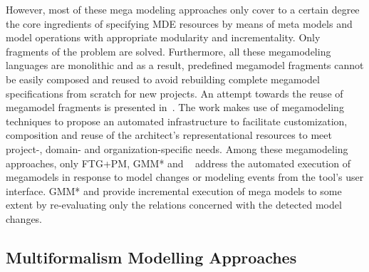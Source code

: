 However, most of these mega modeling approaches only cover to a certain degree
the core ingredients of specifying MDE resources by means of meta models and
model operations with appropriate modularity and incrementality. Only fragments
of the problem are solved. Furthermore, all these megamodeling languages are
monolithic and as a result, predefined megamodel fragments cannot be %
easily%
composed and reused to avoid
rebuilding complete megamodel specifications from scratch  for new projects. An attempt towards the reuse of megamodel fragments is presented in~\cite{Hilliard2012,Hilliard2010}. 
The work makes use of megamodeling techniques to propose an automated infrastructure to facilitate customization, composition and reuse of the architect's representational resources to meet project-, domain- and organization-specific needs.
Among these megamodeling approaches, only FTG+PM, GMM* and ~\cite{SNG10, SHG12}
address the automated execution of megamodels in response to model changes or
modeling events from the tool's user interface. GMM* and \cite{SNG10,
SHG12} provide incremental execution of mega models to some extent by
re-evaluating only the relations concerned with the detected model changes.


% 
\subsection{Multiformalism Modelling Approaches}

